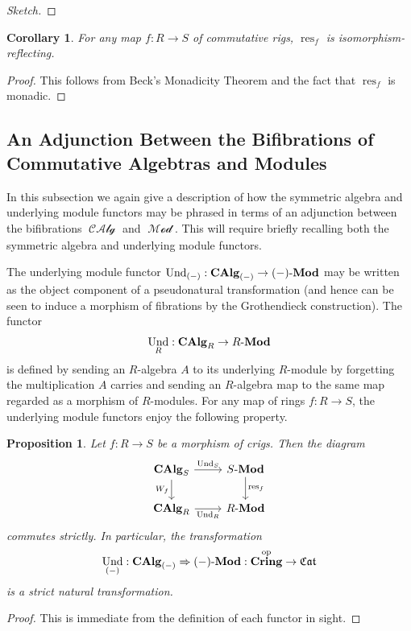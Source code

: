\documentclass{amsart}
\newtheorem{proposition}[equation]{Proposition}
\newtheorem{corollary}[equation]{Corollary}
\theoremstyle{definition}
\DeclareMathOperator{\Cring}{\mathbf{Cring}}
\DeclareMathOperator{\fCat}{\mathfrak{Cat}}
\DeclareMathOperator{\res}{res}
\DeclareMathOperator{\op}{op}
\DeclareMathOperator{\MMod}{\mathcal{Mod}}
\DeclareMathOperator{\CCalg}{\mathcal{CAlg}}
\DeclareMathOperator{\und}{Und}
\newcommand{\CAlg}[1]{\mathbf{CAlg}_{#1}}
\newcommand{\Und}[1]{\und_{#1}}
\newcommand{\Mod}[1]{{#1}\textnormal{-}\mathbf{Mod}}
\numberwithin{equation}{subsection}
\begin{document}
\begin{proof}[Sketch]
\end{proof}
\begin{corollary}\label{Cor: Section Background Alg: Restriction of scalars is monadic}
For any map $f:R \to S$ of commutative rigs, $\res_{f}$ is isomorphism-reflecting.
\end{corollary}
\begin{proof}
This follows from Beck's Monadicity Theorem and the fact that $\res_{f}$ is monadic.
\end{proof}

\subsection{An Adjunction Between the Bifibrations of Commutative Algebtras and Modules}\label{Subsection: Background Alg: Adjunction between bifibration}
In this subsection we again give a description of how the symmetric algebra and underlying module functors may be phrased in terms of an adjunction between the bifibrations $\CCalg$ and $\MMod$. This will require briefly recalling both the symmetric algebra and underlying module functors.

The underlying module functor $\Und{(-)}:\CAlg{(-)} \to \Mod{(-)}$ may be written as the object component of a pseudonatural transformation (and hence can be seen to induce a morphism of fibrations by the Grothendieck construction). The functor
\[
\Und{R}:\CAlg{R} \to \Mod{R}
\]
is defined by sending an $R$-algebra $A$ to its underlying $R$-module by forgetting the multiplication $A$ carries and sending an $R$-algebra map to the same map regarded as a morphism of $R$-modules. For any map of rings $f:R \to S$, the underlying module functors enjoy the following property. 
\begin{proposition}\label{Prop: Section Background in Algebra: Underlying commutes strictly with restriction}
Let $f:R \to S$ be a morphism of crigs. Then the diagram
\[
\begin{tikzcd}
\CAlg{S} \ar[r]{}{\Und{S}} \ar[d, swap]{}{W_{f}} & \Mod{S} \ar[d]{}{\res_{f}} \\
\CAlg{R} \ar[r, swap]{}{\Und{R}} & \Mod{R}
\end{tikzcd}
\]
commutes strictly. In particular, the transformation
\[
\Und{(-)}:\CAlg{(-)} \Rightarrow \Mod{(-)}:\Cring^{\op} \to \fCat
\] 
is a strict natural transformation.
\end{proposition}
\begin{proof}
This is immediate from the definition of each functor in sight.
\end{proof}
\end{document}
